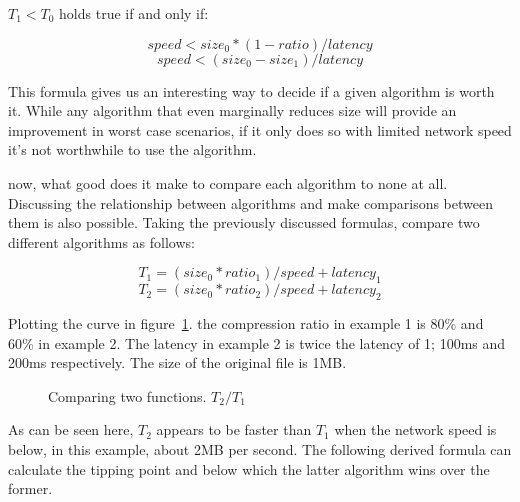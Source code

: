 \documentclass[11pt,a4paper]{report}
\begin{document}
$T_1 < T_0$ holds true if and only if:

\begin{equation}
\label{networkspeedmin} speed < size_0 * (1 - ratio) / latency
\end{equation}
\begin{equation}
speed < (size_0 - size_1) / latency
\end{equation}

This formula gives us an interesting way to decide if a given algorithm is worth it. While any algorithm that even marginally reduces size will provide an improvement in worst case scenarios, if it only does so with limited network speed it's not worthwhile to use the algorithm.

now, what good does it make to compare each algorithm to none at all. Discussing the relationship between algorithms and make comparisons between them is also possible. Taking the previously discussed formulas, compare two different algorithms as follows:

\begin{equation}
T_1 = (size_0 * ratio_1) / speed + latency_1
\end{equation}
\begin{equation}
T_2 = (size_0 * ratio_2) / speed + latency_2
\end{equation}

Plotting the curve in figure~\ref{fig:CurveNetworkLimitationSpeedTwo}. the compression ratio in example 1 is 80\% and 60\% in example 2. The latency in example 2 is twice the latency of 1; 100ms and 200ms respectively. The size of the original file is 1MB. 

\begin{figure}[h!]
    \centering
{}
\caption{
\label{fig:CurveNetworkLimitationSpeedTwo} Comparing two functions. $T_2 / T_1$}
\end{figure}

As can be seen here, $T_2$ appears to be faster than $T_1$ when the network speed is below, in this example, about 2MB per second. The following derived formula can calculate the tipping point and below which the latter algorithm wins over the former.
\end{document}
